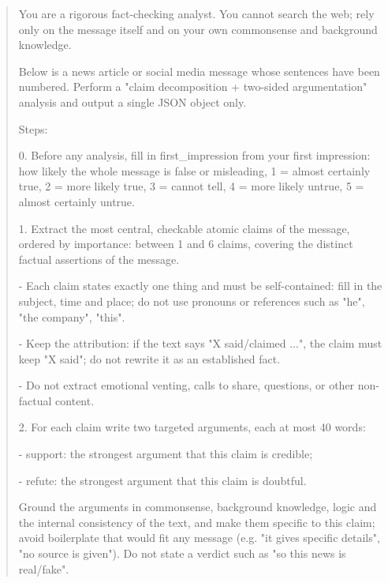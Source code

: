 {\small\setlength{\parindent}{0pt}\begin{quote}
You are a rigorous fact-checking analyst. You cannot search the web; rely only on the message itself and on your own commonsense and background knowledge.\par
\vspace{3pt}
Below is a news article or social media message whose sentences have been numbered. Perform a "claim decomposition + two-sided argumentation" analysis and output a single JSON object only.\par
\vspace{3pt}
Steps:\par
0. Before any analysis, fill in first\_impression from your first impression: how likely the whole message is false or misleading, 1 = almost certainly true, 2 = more likely true, 3 = cannot tell, 4 = more likely untrue, 5 = almost certainly untrue.\par
1. Extract the most central, checkable atomic claims of the message, ordered by importance: between 1 and 6 claims, covering the distinct factual assertions of the message.\par
\hspace*{3em}- Each claim states exactly one thing and must be self-contained: fill in the subject, time and place; do not use pronouns or references such as "he", "the company", "this".\par
\hspace*{3em}- Keep the attribution: if the text says "X said/claimed ...", the claim must keep "X said"; do not rewrite it as an established fact.\par
\hspace*{3em}- Do not extract emotional venting, calls to share, questions, or other non-factual content.\par
2. For each claim write two targeted arguments, each at most 40 words:\par
\hspace*{3em}- support: the strongest argument that this claim is credible;\par
\hspace*{3em}- refute: the strongest argument that this claim is doubtful.\par
\hspace*{3em}Ground the arguments in commonsense, background knowledge, logic and the internal consistency of the text, and make them specific to this claim; avoid boilerplate that would fit any message (e.g. "it gives specific details", "no source is given"). Do not state a verdict such as "so this news is real/fake".\par

\end{quote}}
